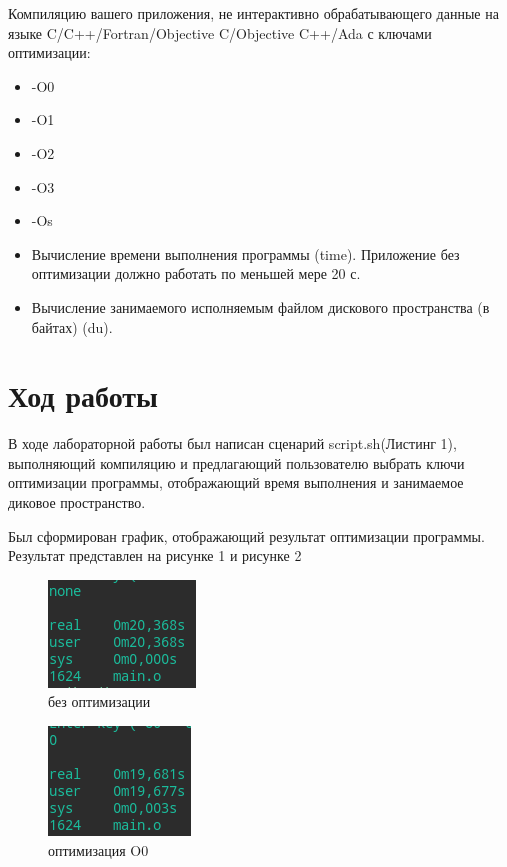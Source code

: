 \documentclass[a4paper,12pt]{article}
\begin{document}
    Компиляцию вашего приложения, не интерактивно обрабатывающего
    данные на языке C/C++/Fortran/Objective C/Objective C++/Ada с ключами
    оптимизации:
    \begin{itemize}
        \item -O0
        \item -O1
        \item -O2
        \item -O3
        \item -Os
        \item Вычисление времени выполнения программы (time). Приложение без
    оптимизации должно работать по меньшей мере 20 с.
        \item Вычисление занимаемого исполняемым файлом дискового пространства (в
    байтах) (du).
    \end{itemize}

    \section*{Ход работы}
    В ходе лабораторной работы был написан сценарий script.sh(Листинг 1), выполняющий компиляцию и предлагающий пользователю выбрать ключи оптимизации программы, отображающий время выполнения и занимаемое диковое пространство.
    \begin{center}
        
    \end{center}

    Был сформирован график, отображающий результат оптимизации программы. Результат представлен на рисунке 1 и рисунке 2
\clearpage

        \begin{figure}[!h]
            \centering
            \includegraphics{none.png}
            \caption{ без оптимизации}
            
        \end{figure}   

        
        \begin{figure}[!h]
            \centering
            \includegraphics{O0.png}
            \caption{ оптимизация O0}
            
        \end{figure}   
        
\end{document}
